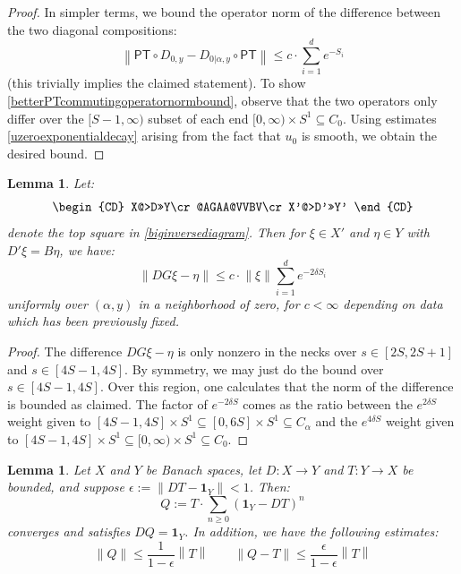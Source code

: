 \documentclass[12pt]{article}
\newtheorem{lemma}[theorem]{Lemma}
\theoremstyle{definition}
\theoremstyle{remark}
\numberwithin{equation}{subsection}
\newcommand{\PT}{\mathsf{PT}}
\begin{document}
\begin{proof}
In simpler terms, we bound the operator norm of the difference between the two diagonal compositions:
\begin{equation}\label{betterPTcommutingoperatornormbound}
\left\|\PT\circ D_{0,y}-D_{0|\alpha,y}\circ\PT\right\|\leq c\cdot\sum_{i=1}^de^{-S_i}
\end{equation}
(this trivially implies the claimed statement).  To show \eqref{betterPTcommutingoperatornormbound}, observe that the two operators only differ over the $[S-1,\infty)$ subset of each end $[0,\infty)\times S^1\subseteq C_0$.  Using estimates \eqref{uzeroexponentialdecay} arising from the fact that $u_0$ is smooth, we obtain the desired bound.
\end{proof}

\begin{lemma}\label{approxtop}
Let:
\begin{equation}
\begin{CD}
X@>D>>Y\cr
@AGAA@VVBV\cr
X'@>D'>>Y'
\end{CD}
\end{equation}
denote the top square in \eqref{biginversediagram}.  Then for $\xi\in X'$ and $\eta\in Y$ with $D'\xi=B\eta$, we have:
\begin{equation}
\left\|DG\xi-\eta\right\|\leq c\cdot\left\|\xi\right\|\sum_{i=1}^de^{-2\delta S_i}
\end{equation}
uniformly over $(\alpha,y)$ in a neighborhood of zero, for $c<\infty$ depending on data which has been previously fixed.
\end{lemma}

\begin{proof}
The difference $DG\xi-\eta$ is only nonzero in the necks over $s\in[2S,2S+1]$ and $s\in[4S-1,4S]$.  By symmetry, we may just do the bound over $s\in[4S-1,4S]$.  Over this region, one calculates that the norm of the difference is bounded as claimed.  The factor of $e^{-2\delta S}$ comes as the ratio between the $e^{2\delta S}$ weight given to $[4S-1,4S]\times S^1\subseteq[0,6S]\times S^1\subseteq C_\alpha$ and the $e^{4\delta S}$ weight given to $[4S-1,4S]\times S^1\subseteq[0,\infty)\times S^1\subseteq C_0$.
\end{proof}

\begin{lemma}\label{bootstrapinverse}
Let $X$ and $Y$ be Banach spaces, let $D:X\to Y$ and $T:Y\to X$ be bounded, and suppose $\epsilon:=\left\|DT-\mathbf 1_Y\right\|<1$.  Then:
\begin{equation}
Q:=T\cdot\sum_{n\geq 0}(\mathbf 1_Y-DT)^n
\end{equation}
converges and satisfies $DQ=\mathbf 1_Y$.  In addition, we have the following estimates:
\begin{equation}
\left\|Q\right\|\leq\frac 1{1-\epsilon}\left\|T\right\|\qquad
\left\|Q-T\right\|\leq\frac\epsilon{1-\epsilon}\left\|T\right\|
\end{equation}
\end{lemma}
\end{document}
